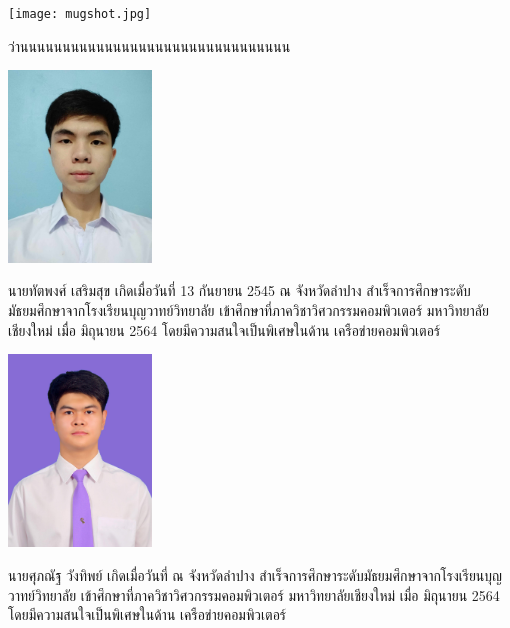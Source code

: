 \documentclass[semifinal]{cpecmu}
\author{นายชลนันต์ ทองไทย}{Chonlanan Thongthai}{640610625}
\author{นายทัตพงศ์ เสริมสุข}{Tadphong Sermsook}{640610636}
\author{นายศุภณัฐ วังทิพย์}{Suphanath Wangtip}{640612098}
\begin{document}


\pagestyle{empty}\cleardoublepage
\normalspacing \setcounter{page}{1}  \pagestyle{cpecmu}





\ifproject

\fi



\ifproject
\normalspacing
\appendix


\ifglossary\glossarypage\fi

\ifindex\indexpage\fi

\begin{biosketch}
  \begin{center}
    \texttt{[image: mugshot.jpg]}
  \end{center}
  \hspace{0.5in}ว่านนนนนนนนนนนนนนนนนนนนนนนนนนนนนนนน
\begin{center}
  \includegraphics[width=1.5in]{636.jpg}
\end{center}
\hspace{0.5in}นายทัตพงศ์ เสริมสุข เกิดเมื่อวันที่ 13 กันยายน 2545 ณ จังหวัดลำปาง สำเร็จการศึกษาระดับมัธยมศึกษาจากโรงเรียนบุญวาทย์วิทยาลัย เข้าศึกษาที่ภาควิชาวิศวกรรมคอมพิวเตอร์ 
มหาวิทยาลัยเชียงใหม่ เมื่อ มิถุนายน 2564 โดยมีความสนใจเป็นพิเศษในด้าน เครือข่ายคอมพิวเตอร์
\begin{center}
  \includegraphics[width=1.5in]{098.jpg}
\end{center}
\hspace{0.5in}นายศุภณัฐ วังทิพย์ เกิดเมื่อวันที่  ณ จังหวัดลำปาง สำเร็จการศึกษาระดับมัธยมศึกษาจากโรงเรียนบุญวาทย์วิทยาลัย เข้าศึกษาที่ภาควิชาวิศวกรรมคอมพิวเตอร์ 
มหาวิทยาลัยเชียงใหม่ เมื่อ มิถุนายน 2564 โดยมีความสนใจเป็นพิเศษในด้าน เครือข่ายคอมพิวเตอร์
\end{biosketch}
\fi %
\end{document}
